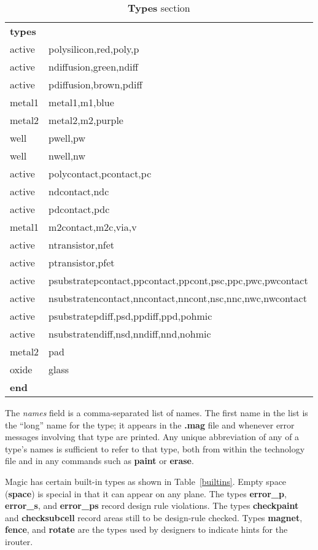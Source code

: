 \documentclass[letterpaper,twoside,12pt]{article}
\begin{document}
\begin{table}[ht]
   \begin{center}
      \begin{tabular}{|ll|} \hline
	  {\bfseries types} & \\
	  active 	& polysilicon,red,poly,p \\
	  active	& ndiffusion,green,ndiff \\
	  active	& pdiffusion,brown,pdiff \\
	  metal1	& metal1,m1,blue \\
	  metal2	& metal2,m2,purple \\
	  well		& pwell,pw \\
	  well		& nwell,nw \\
	  active	& polycontact,pcontact,pc \\
	  active	& ndcontact,ndc \\
	  active	& pdcontact,pdc \\
	  metal1	& m2contact,m2c,via,v \\
	  active	& ntransistor,nfet \\
	  active	& ptransistor,pfet \\
	  active	& psubstratepcontact,ppcontact,ppcont,psc,ppc,pwc,pwcontact \\
	  active	& nsubstratencontact,nncontact,nncont,nsc,nnc,nwc,nwcontact \\
	  active	& psubstratepdiff,psd,ppdiff,ppd,pohmic \\
	  active	& nsubstratendiff,nsd,nndiff,nnd,nohmic \\
	  metal2	& pad \\
	  oxide		& glass \\
	  {\bfseries end} & \\ \hline
      \end{tabular}
      \caption{{\bfseries Types} section}
      \label{types}
   \end{center}
\end{table}

The {\itshape names} field is a comma-separated list of names.
The first name in the list is the ``long'' name for the type;
it appears in the {\bfseries .mag} file and whenever error messages involving
that type are printed.
Any unique abbreviation of any of a type's names is sufficient
to refer to that type, both from within the technology file
and in any commands such as
{\bfseries paint} or {\bfseries erase}.

Magic has certain built-in types as shown in Table~\ref{builtins}.
Empty space ({\bfseries space})
is special in that it can appear on any plane.
The types {\bfseries error{\_}p}, {\bfseries error{\_}s}, and {\bfseries error{\_}ps}
record design rule violations.
The types {\bfseries checkpaint} and {\bfseries checksubcell}
record areas still to be design-rule checked.
Types {\bfseries magnet}, {\bfseries fence}, and {\bfseries rotate} are the types
used by designers to indicate hints for the irouter.
\end{document}
